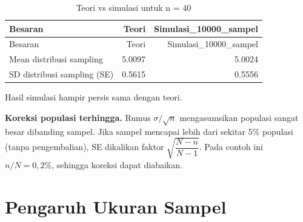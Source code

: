 \documentclass[
  indonesian,
  letterpaper,
]{book}
\begin{document}
\begin{longtable}[]{@{}lrr@{}}
\caption{Teori vs simulasi untuk n = 40}\tabularnewline
\toprule\noalign{}
Besaran & Teori & Simulasi\_10000\_sampel \\
\midrule\noalign{}
\endfirsthead
\toprule\noalign{}
Besaran & Teori & Simulasi\_10000\_sampel \\
\midrule\noalign{}
\endhead
\bottomrule\noalign{}
\endlastfoot
Mean distribusi sampling & 5.0097 & 5.0024 \\
SD distribusi sampling (SE) & 0.5615 & 0.5556 \\
\end{longtable}

Hasil simulasi hampir persis sama dengan teori.

\textbf{Koreksi populasi terhingga.} Rumus \(\sigma/\sqrt{n}\)
mengasumsikan populasi sangat besar dibanding sampel. Jika sampel
mencapai lebih dari sekitar 5\% populasi (tanpa pengembalian), SE
dikalikan faktor \(\sqrt{\dfrac{N-n}{N-1}}\). Pada contoh ini
\(n/N = 0{,}2\%\), sehingga koreksi dapat diabaikan.

\section{Pengaruh Ukuran Sampel}\label{pengaruh-ukuran-sampel}
\end{document}
